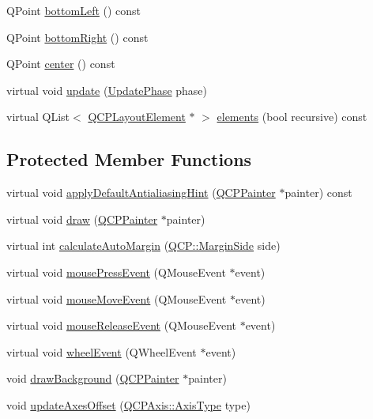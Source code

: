 \begin{DoxyCompactItemize}
\item 
Q\+Point \hyperlink{classQCPAxisRect_a724b0333971ea6a338f0dbd814dc97ae}{bottom\+Left} () const 
\item 
Q\+Point \hyperlink{classQCPAxisRect_a49ea3c7dff834b47e266cbf3d79f78b9}{bottom\+Right} () const 
\item 
Q\+Point \hyperlink{classQCPAxisRect_aea5e6042bca198424fa1bc02fc282e59}{center} () const 
\item 
virtual void \hyperlink{classQCPAxisRect_a255080a017df9083a60a321ef2ba9ed8}{update} (\hyperlink{classQCPLayoutElement_a0d83360e05735735aaf6d7983c56374d}{Update\+Phase} phase)
\item 
virtual Q\+List$<$ \hyperlink{classQCPLayoutElement}{Q\+C\+P\+Layout\+Element} $\ast$ $>$ \hyperlink{classQCPAxisRect_a2bda6bf2b5b5797f92583cecd01c8949}{elements} (bool recursive) const 
\end{DoxyCompactItemize}
\subsection*{Protected Member Functions}
\begin{DoxyCompactItemize}
\item 
virtual void \hyperlink{classQCPAxisRect_a9a6dd0763701cbc7d01f899bcbb3f9ca}{apply\+Default\+Antialiasing\+Hint} (\hyperlink{classQCPPainter}{Q\+C\+P\+Painter} $\ast$painter) const 
\item 
virtual void \hyperlink{classQCPAxisRect_afb1bbbbda8345cd2710d92ee48440b53}{draw} (\hyperlink{classQCPPainter}{Q\+C\+P\+Painter} $\ast$painter)
\item 
virtual int \hyperlink{classQCPAxisRect_ae79f18302e6507586aa8c032a5f9ed1c}{calculate\+Auto\+Margin} (\hyperlink{namespaceQCP_a7e487e3e2ccb62ab7771065bab7cae54}{Q\+C\+P\+::\+Margin\+Side} side)
\item 
virtual void \hyperlink{classQCPAxisRect_a77501dbeccdac7256f7979b05077c04e}{mouse\+Press\+Event} (Q\+Mouse\+Event $\ast$event)
\item 
virtual void \hyperlink{classQCPAxisRect_a4baf3d5dd69166788f6ceda0ea182c6e}{mouse\+Move\+Event} (Q\+Mouse\+Event $\ast$event)
\item 
virtual void \hyperlink{classQCPAxisRect_adf6c99780cea55ab39459a6eaad3a94a}{mouse\+Release\+Event} (Q\+Mouse\+Event $\ast$event)
\item 
virtual void \hyperlink{classQCPAxisRect_a5acf41fc30aa68ea263246ecfad85c31}{wheel\+Event} (Q\+Wheel\+Event $\ast$event)
\item 
void \hyperlink{classQCPAxisRect_ab49d338d1ce74b476fcead5b32cf06dc}{draw\+Background} (\hyperlink{classQCPPainter}{Q\+C\+P\+Painter} $\ast$painter)
\item 
void \hyperlink{classQCPAxisRect_a6024ccdc74f5dc0e8a0fe482e5b28a20}{update\+Axes\+Offset} (\hyperlink{classQCPAxis_ae2bcc1728b382f10f064612b368bc18a}{Q\+C\+P\+Axis\+::\+Axis\+Type} type)
\end{DoxyCompactItemize}
